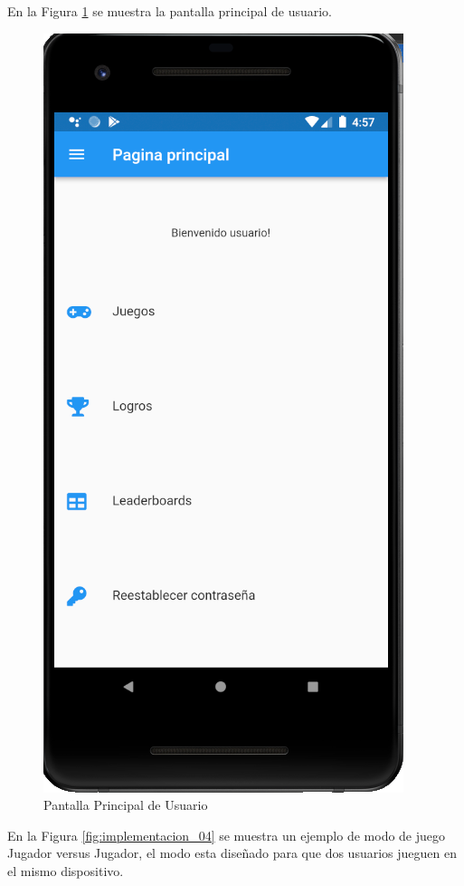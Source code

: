 \documentclass{article}
\begin{document}
En la Figura \ref{fig:implementacion_03} se muestra la pantalla principal de usuario.

\begin{figure}[H]
    \centering
    \includegraphics[scale=0.8]{imgs/Imp/MainUsuario}
    \caption{Pantalla Principal de Usuario}
    \label{fig:implementacion_03}
\end{figure}

En la Figura \ref{fig:implementacion_04} se muestra un ejemplo de modo de juego 
Jugador versus Jugador, el modo esta diseñado para que dos usuarios jueguen en 
el mismo dispositivo.
\end{document}
